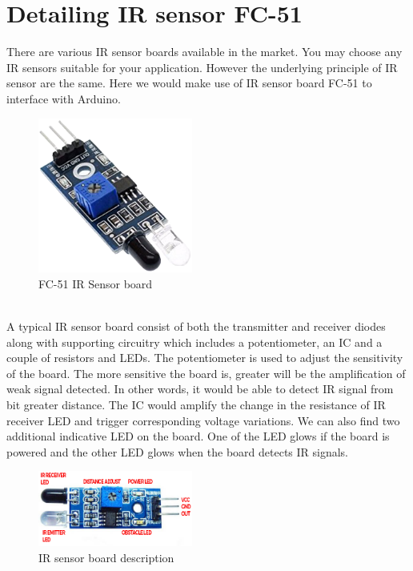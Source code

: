 \section{Detailing IR sensor FC-51}
There are various IR sensor boards available in the market. You may choose any IR sensors suitable for your application. However the underlying principle of IR sensor are the same. Here we would make use of IR sensor board FC-51 to interface with Arduino.\\
\begin{figure}[h!]	
	\centering
	\includegraphics[width=2in]{Chapters/images/IR_board.png}
	\caption{FC-51 IR Sensor board}
\end{figure}\\
A typical IR sensor board consist of both the transmitter and receiver diodes along with supporting circuitry which includes a potentiometer, an IC and a couple of resistors and LEDs. The potentiometer is used to adjust the sensitivity of the board. The more sensitive the board is, greater will be the amplification of weak signal detected. In other words, it would be able to detect IR signal from bit greater distance. The IC would amplify the change in the resistance of IR receiver LED and trigger corresponding voltage variations. We can also find two additional indicative LED on the board. One of the LED glows if the board is powered and the other LED glows when the board detects IR signals.
\vspace{0.5cm}
\begin{figure}[h!]	
	\centering
	\includegraphics[width=2in]{Chapters/images/IR_board_desp.png}
	\caption{IR sensor board description}
\end{figure}

